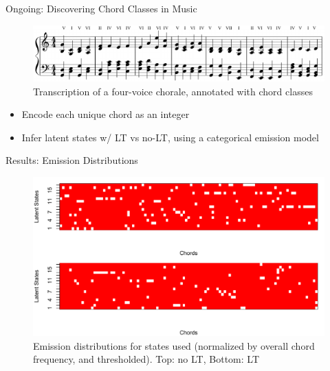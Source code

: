 \documentclass[11pt, mathserif, handout, table]{beamer}
\begin{document}
\begin{frame}{Ongoing: Discovering Chord Classes in Music}
  \begin{figure}
    \centering
    \includegraphics[width=\textwidth]{img/chords_annotated.pdf}
    \caption{Transcription of a four-voice chorale, annotated with chord classes}
  \end{figure}
  \begin{itemize}
  \item Encode each unique chord as an integer
  \item Infer latent states w/ LT vs no-LT, using a categorical
    emission model
  \end{itemize}
\end{frame}

\begin{frame}{Results: Emission Distributions}
  \begin{figure}
    \centering
    \includegraphics[width = \textwidth]{img/chord_emissions.pdf}
    \caption{Emission distributions for states used (normalized by
      overall chord frequency, and thresholded).  Top: no LT, Bottom: LT}
  \end{figure}
\end{frame}
\end{document}
